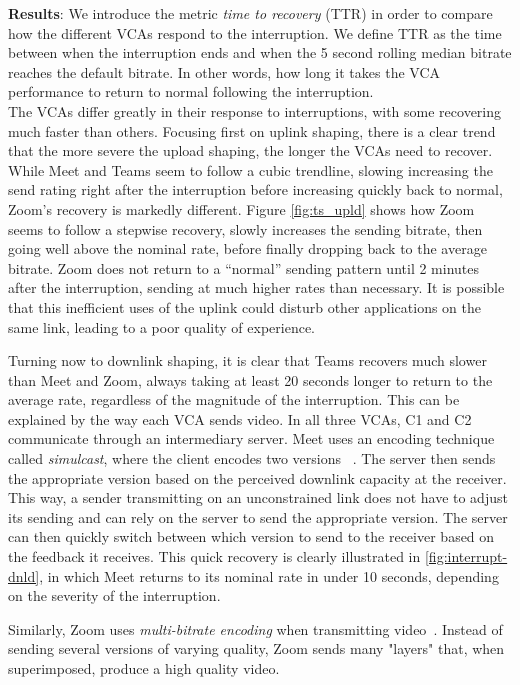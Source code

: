 

\noindent \textbf{Results}: 
We introduce the metric \textit{time to recovery} (TTR) in order to compare how the different VCAs respond to the interruption. We define TTR as the time 
between when the interruption ends and when the 5 second rolling median bitrate reaches the default bitrate. In other words, how long it takes the VCA performance to return to normal following the interruption.\\
The VCAs differ greatly in their response to interruptions, with some recovering much faster than others. Focusing first on uplink shaping, there is a clear trend that the more severe the upload shaping, the longer the VCAs need to recover. While Meet and Teams seem to follow a cubic trendline, slowing increasing the send rating right after the interruption before increasing quickly back to normal, Zoom's recovery is markedly different. Figure \ref{fig:ts_upld} shows how Zoom seems to follow a stepwise recovery, slowly increases the sending bitrate, then going well above the nominal rate, before finally dropping back to the average bitrate. Zoom does not return to a ``normal'' sending pattern until 2 minutes after the interruption, sending at much higher rates than necessary. It is possible that this inefficient uses of the uplink could disturb other applications on the same link, leading to a poor quality of experience. 

Turning now to downlink shaping, it is clear that Teams recovers much slower than Meet and Zoom, always taking at least 20 seconds longer to return to the average rate, regardless of the magnitude of the interruption. This can be explained by the way each VCA sends video. In all three VCAs, C1 and C2 communicate through an intermediary server. Meet uses an encoding technique called \textit{simulcast}, where the client encodes two versions ~\cite{nistico2020comparative}. The server then sends the appropriate version based on the perceived downlink capacity at the receiver. This way, a sender transmitting on an unconstrained link does not have to adjust its sending and can rely on the server to send the appropriate version. The server can then quickly switch between which version to send to the receiver based on the feedback it receives. This quick recovery is clearly illustrated in \ref{fig:interrupt-dnld}, in which Meet returns to its nominal rate in under 10 seconds, depending on the severity of the interruption.

Similarly, Zoom uses \textit{multi-bitrate encoding} when transmitting video~\cite{zoom_encoding}. Instead of sending several versions of varying quality, Zoom sends many "layers" that, when superimposed, produce a high quality video. 

